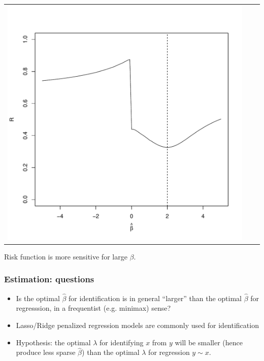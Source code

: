 \documentclass{beamer}
\begin{document}
\begin{frame}
\begin{center}
\begin{tabular}{ccc}
\includegraphics[scale = .2]{risk_2.pdf} 
\end{tabular}
\end{center}
Risk function is more sensitive for large $\beta$.
\end{frame}

\begin{frame}
\frametitle{Estimation: questions}
\begin{itemize}
\item Is the optimal $\hat{\beta}$ for identification is
  in general ``larger'' than the optimal $\hat{\beta}$ for
  regresssion, in a frequentist (e.g. minimax) sense?
\item Lasso/Ridge penalized regression models are commonly used for
  identification
\item Hypothesis: the optimal $\lambda$ for identifying $x$ from $y$
  will be smaller (hence produce less sparse $\hat{\beta}$) than the
  optimal $\lambda$ for regression $y \sim x$.
\end{itemize}
\end{frame}
\end{document}
